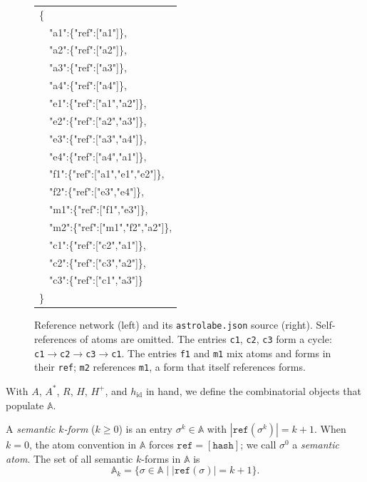\begin{figure}[ht]
\centering
\begin{minipage}[t]{0.48\textwidth}
\vspace{0pt}
\centering
\scalebox{1.5}{}
\end{minipage}%
\hspace{4pt}%
\begin{minipage}[t]{0.48\textwidth}
\vspace{0pt}
{\scriptsize\ttfamily
\begin{tabular}{@{}l@{}}
\{\\
\ \ "a1":\{"ref":["a1"]\},\\
\ \ "a2":\{"ref":["a2"]\},\\
\ \ "a3":\{"ref":["a3"]\},\\
\ \ "a4":\{"ref":["a4"]\},\\
\ \ "e1":\{"ref":["a1","a2"]\},\\
\ \ "e2":\{"ref":["a2","a3"]\},\\
\ \ "e3":\{"ref":["a3","a4"]\},\\
\ \ "e4":\{"ref":["a4","a1"]\},\\
\ \ "f1":\{"ref":["a1","e1","e2"]\},\\
\ \ "f2":\{"ref":["e3","e4"]\},\\
\ \ "m1":\{"ref":["f1","e3"]\},\\
\ \ "m2":\{"ref":["m1","f2","a2"]\},\\
\ \ "c1":\{"ref":["c2","a1"]\},\\
\ \ "c2":\{"ref":["c3","a2"]\},\\
\ \ "c3":\{"ref":["c1","a3"]\}\\
\}
\end{tabular}
}
\end{minipage}
\caption{Reference network (left) and its \texttt{astrolabe.json} source (right). Self-references of atoms are omitted. The entries \texttt{c1}, \texttt{c2}, \texttt{c3} form a cycle: \texttt{c1}$\to$\texttt{c2}$\to$\texttt{c3}$\to$\texttt{c1}. The entries \texttt{f1} and \texttt{m1} mix atoms and forms in their \texttt{ref}; \texttt{m2} references \texttt{m1}, a form that itself references forms.}
\label{fig:astrolabe-network}
\end{figure}

With $A$, $A^*$, $R$, $H$, $H^+$, and $h_{\mathrm{id}}$ in hand, we define the combinatorial objects that populate $\mathbb{A}$.

\begin{definition}
\label{def:form}
A \emph{semantic $k$-form} ($k \geq 0$) is an entry $\sigma^k \in \mathbb{A}$ with $|\texttt{ref}(\sigma^k)| = k+1$. When $k = 0$, the atom convention in $\mathbb{A}$ forces $\texttt{ref} = [\texttt{hash}]$; we call $\sigma^0$ a \emph{semantic atom}. The set of all semantic $k$-forms in $\mathbb{A}$ is
\[
\mathbb{A}_k = \bigl\{\sigma \in \mathbb{A} \;\big|\; |\texttt{ref}(\sigma)| = k+1\bigr\}.
\]
\end{definition}

